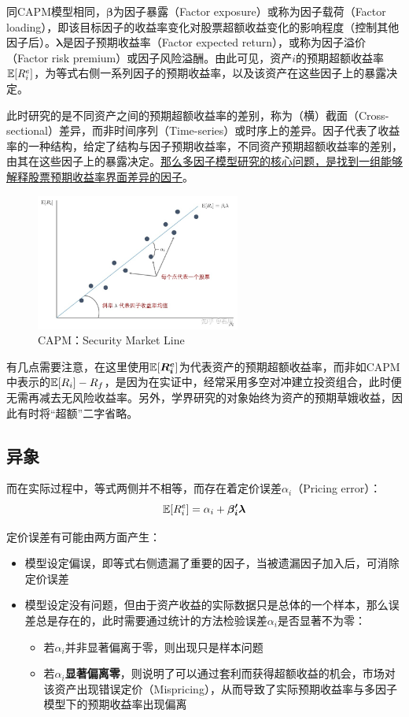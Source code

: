 \documentclass[11pt]{article}
\begin{document}
同CAPM模型相同，$\bm{\beta}$为因子暴露（Factor exposure）或称为因子载荷（Factor loading），即该目标因子的收益率变化对股票超额收益变化的影响程度（控制其他因子后）。$\bm{\lambda}$是因子预期收益率（Factor expected return），或称为因子溢价（Factor risk premium）或因子风险溢酬。由此可见，资产$i$的预期超额收益率$\mathbb{E}[R_i^e]$，为等式右侧一系列因子的预期收益率，以及该资产在这些因子上的暴露决定。

此时研究的是不同资产之间的预期超额收益率的差别，称为（横）截面（Cross-sectional）差异，而非时间序列（Time-series）或时序上的差异。因子代表了收益率的一种结构，给定了结构与因子预期收益率，不同资产预期超额收益率的差别，由其在这些因子上的暴露决定。\uline{那么多因子模型研究的核心问题，是找到一组能够解释股票预期收益率界面差异的因子}。

\begin{figure}[H]
    \centering
    \includegraphics[width=0.6\textwidth]{fig/capm_sml.jpg}
    \caption{CAPM：Security Market Line}
    \label{fig:sml}
\end{figure}

有几点需要注意，在这里使用$\mathbb{E}[\bm{R_i^e}]$为代表资产的预期超额收益率，而非如CAPM中表示的$\mathbb{E}[R_i] - R_f$，是因为在实证中，经常采用多空对冲建立投资组合，此时便无需再减去无风险收益率。另外，学界研究的对象始终为资产的预期草娥收益，因此有时将“超额”二字省略。

\subsection{异象}

而在实际过程中，等式两侧并不相等，而存在着定价误差$\alpha_i$（Pricing error）：
\begin{equation*}
    \mathbb{E}[R_i^e] = \alpha_i + \bm{\beta_{i}' \lambda}
\end{equation*}

定价误差有可能由两方面产生：
\begin{itemize}
    \item 模型设定偏误，即等式右侧遗漏了重要的因子，当被遗漏因子加入后，可消除定价误差
    \item 模型设定没有问题，但由于资产收益的实际数据只是总体的一个样本，那么误差总是存在的，此时需要通过统计的方法检验误差$\alpha_i$是否显著不为零：
    \begin{itemize}
        \item 若$\alpha_i$并非显著偏离于零，则出现只是样本问题
        \item 若$\alpha_i$\textbf{显著偏离零}，则说明了可以通过套利而获得超额收益的机会，市场对该资产出现错误定价（Mispricing），从而导致了实际预期收益率与多因子模型下的预期收益率出现偏离
    \end{itemize}
\end{itemize}
\end{document}
